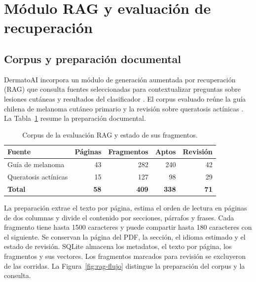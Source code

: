 \appendices
\section{Módulo RAG y evaluación de recuperación}
\label{app:rag}

\subsection{Corpus y preparación documental}
DermatoAI incorpora un módulo de generación aumentada por recuperación (RAG) que consulta fuentes seleccionadas para contextualizar preguntas sobre lesiones cutáneas y resultados del clasificador \cite{raglewis2020}. El corpus evaluado reúne la guía chilena de melanoma cutáneo primario \cite{ragcabrera2020} y la revisión sobre queratosis actínicas \cite{ragcanueto2025}. La Tabla~\ref{tab:rag-corpus} resume la preparación documental.

\begin{table}[!ht]
\centering
\caption{Corpus de la evaluación RAG y estado de sus fragmentos.}
\label{tab:rag-corpus}
\small
\setlength{\tabcolsep}{5pt}
\begin{tabular}{lrrrr}
\toprule
Fuente & Páginas & Fragmentos & Aptos & Revisión \\
\midrule
Guía de melanoma & 43 & 282 & 240 & 42 \\
Queratosis actínicas & 15 & 127 & 98 & 29 \\
\midrule
\textbf{Total} & \textbf{58} & \textbf{409} & \textbf{338} & \textbf{71} \\
\bottomrule
\end{tabular}
\end{table}

La preparación extrae el texto por página, estima el orden de lectura en páginas de dos columnas y divide el contenido por secciones, párrafos y frases. Cada fragmento tiene hasta 1500 caracteres y puede compartir hasta 180 caracteres con el siguiente. Se conservan la página del PDF, la sección, el idioma estimado y el estado de revisión. SQLite almacena los metadatos, el texto por página, los fragmentos y sus vectores. Los fragmentos marcados para revisión se excluyeron de las corridas. La Figura~\ref{fig:rag-flujo} distingue la preparación del corpus y la consulta.

